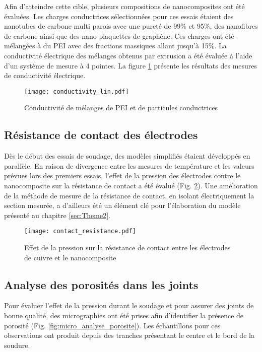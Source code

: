 Afin d'atteindre cette cible, plusieurs compositions de nanocomposites ont été évaluées. 
Les charges conductrices sélectionnées pour ces essais étaient des nanotubes de carbone multi parois avec une pureté de 99\% et 95\%, des nanofibres de carbone ainsi que des nano plaquettes de graphène. 
Ces charges ont été mélangées à du PEI avec des fractions massiques allant jusqu'à 15\%.
La conductivité électrique des mélanges obtenus par extrusion a été évaluée à l'aide d'un système de mesure à 4 pointes. 
La figure \ref{fig:conductivite_lin} présente les résultats des mesures de conductivité électrique. 

\begin{figure}[h]
	\centering
	\texttt{[image: conductivity\_lin.pdf]}
	\caption{Conductivité de mélanges de PEI et de particules conductrices}
	\label{fig:conductivite_lin}
\end{figure}

\FloatBarrier
\subsection{Résistance de contact des électrodes}

Dès le début des essais de soudage, des modèles simplifiés étaient développés en parallèle. 
En raison de divergence entre les mesures de température et les valeurs prévues lors des premiers essais, l'effet de la pression des électrodes contre le nanocomposite sur la résistance de contact a été évalué (Fig. \ref{fig:resistance_contact}). 
Une amélioration de la méthode de mesure de la résistance de contact, en isolant électriquement la section mesurée, a d'ailleurs été un élément clé pour l'élaboration du modèle présenté au chapitre \ref{sec:Theme2}. 

\begin{figure}[h]
	\centering
	\texttt{[image: contact\_resistance.pdf]}
	\caption{Effet de la pression sur la résistance de contact entre les électrodes de cuivre et le nanocomposite}
	\label{fig:resistance_contact}
\end{figure}

\FloatBarrier
\subsection{Analyse des porosités dans les joints}

Pour évaluer l'effet de la pression durant le soudage et pour assurer des joints de bonne qualité, des micrographies ont été prises afin d'identifier la présence de porosité (Fig. \ref{fig:micro_analyse_porosite}). 
Les échantillons pour ces observations ont produit depuis des tranches présentant le centre et le bord de la soudure. 

